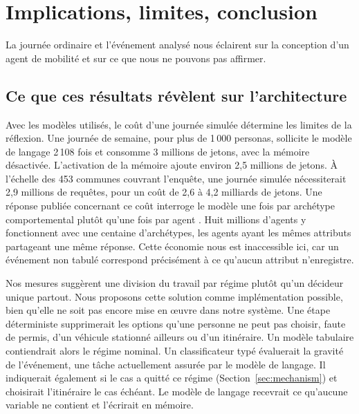 
\section{Implications, limites, conclusion}
\label{sec:implications}

La journée ordinaire et l'événement analysé nous éclairent sur la conception d'un agent de mobilité et sur ce que nous ne pouvons pas affirmer.

\subsection{Ce que ces résultats révèlent sur l'architecture}
\label{sec:architecture-implication}

Avec les modèles utilisés, le coût d'une journée simulée détermine les limites de la réflexion. Une journée de semaine, pour plus de 1\,000 personas, sollicite le modèle de langage 2\,108 fois et consomme 3 millions de jetons, avec la mémoire désactivée. L'activation de la mémoire ajoute environ 2,5 millions de jetons. À l'échelle des 453 communes couvrant l'enquête, une journée simulée nécessiterait 2,9 millions de requêtes, pour un coût de 2,6 à 4,2 milliards de jetons. Une réponse publiée concernant ce coût interroge le modèle une fois par archétype comportemental plutôt qu'une fois par agent \citep{chopra2024limits}. Huit millions d'agents y fonctionnent avec une centaine d'archétypes, les agents ayant les mêmes attributs partageant une même réponse. Cette économie nous est inaccessible ici, car un événement non tabulé correspond précisément à ce qu'aucun attribut n'enregistre.

Nos mesures suggèrent une division du travail par régime plutôt qu'un décideur unique partout. Nous proposons cette solution comme implémentation possible, bien qu'elle ne soit pas encore mise en œuvre dans notre système. Une étape déterministe supprimerait les options qu'une personne ne peut pas choisir, faute de permis, d'un véhicule stationné ailleurs ou d'un itinéraire. Un modèle tabulaire contiendrait alors le régime nominal. Un classificateur typé évaluerait la gravité de l'événement, une tâche actuellement assurée par le modèle de langage. Il indiquerait également si le cas a quitté ce régime (Section~\ref{sec:mechanism}) et choisirait l'itinéraire le cas échéant. Le modèle de langage recevrait ce qu'aucune variable ne contient et l'écrirait en mémoire.

